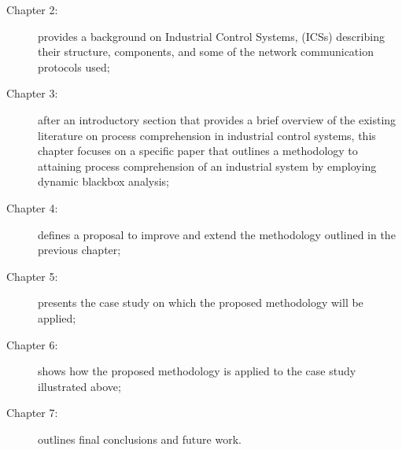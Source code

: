 \begin{description}
	\item [Chapter 2:] provides a background on Industrial Control Systems, (ICSs) describing their structure, components, and some of the network communication protocols used;
	
	\item [Chapter 3:] after an introductory section that provides a brief overview of the existing literature on process comprehension in industrial control systems, this chapter focuses on a specific paper that outlines a methodology to attaining process comprehension of an industrial system by employing dynamic blackbox analysis;
	
	\item [Chapter 4:] defines a proposal to improve and extend the methodology outlined in the previous chapter;
	
	\item [Chapter 5:] presents the case study on which the proposed methodology will be applied;
	
	\item [Chapter 6:] shows how the proposed methodology is applied to the case study illustrated above;
	
	\item [Chapter 7:] outlines final conclusions and future work.
\end{description}

\vfill
